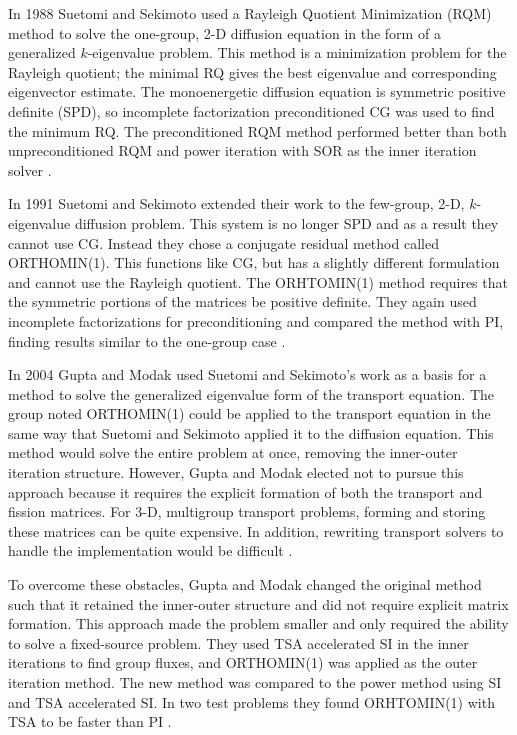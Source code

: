 In 1988 Suetomi and Sekimoto used a Rayleigh Quotient Minimization (RQM) method to solve the one-group, 2-D diffusion equation in the form of a generalized $k$-eigenvalue problem. This method is a minimization problem for the Rayleigh quotient; the minimal RQ gives the best eigenvalue and corresponding eigenvector estimate. The monoenergetic diffusion equation is symmetric positive definite (SPD), so incomplete factorization preconditioned CG was used to find the minimum RQ. The preconditioned RQM method performed better than both unpreconditioned RQM and power iteration with SOR as the inner iteration solver \cite{Suetomi1988}. 

In 1991 Suetomi and Sekimoto extended their work to the few-group, 2-D, $k$-eigenvalue diffusion problem. This system is no longer SPD and as a result they cannot use CG. Instead they chose a conjugate residual method called ORTHOMIN(1). This functions like CG, but has a slightly different formulation and cannot use the Rayleigh quotient. The ORHTOMIN(1) method requires that the symmetric portions of the matrices be positive definite. They again used incomplete factorizations for preconditioning and compared the method with PI, finding results similar to the one-group case \cite{Suetomi1991}.  

In 2004 Gupta and Modak used Suetomi and Sekimoto's work as a basis for a method to solve the generalized eigenvalue form of the transport equation. The group noted ORTHOMIN(1) could be applied to the transport equation in the same way that Suetomi and Sekimoto applied it to the diffusion equation. This method would solve the entire problem at once, removing the inner-outer iteration structure. However, Gupta and Modak elected not to pursue this approach because it requires the explicit formation of both the transport and fission matrices. For 3-D, multigroup transport problems, forming and storing these matrices can be quite expensive. In addition, rewriting transport solvers to handle the implementation would be difficult \cite{Gupta2004}.
 
To overcome these obstacles, Gupta and Modak changed the original method such that it retained the inner-outer structure and did not require explicit matrix formation. This approach made the problem smaller and only required the ability to solve a fixed-source problem. They used TSA accelerated SI in the inner iterations to find group fluxes, and ORTHOMIN(1) was applied as the outer iteration method. The new method was compared to the power method using SI and TSA accelerated SI. In two test problems they found ORHTOMIN(1) with TSA to be faster than PI \cite{Gupta2004}. 

